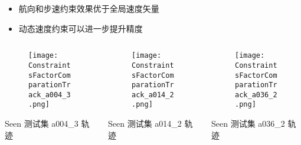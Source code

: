 \begin{frame}
\begin{columns}[t]
		\begin{column}{0.5\textwidth}
		\vspace{-0.5cm}
		{
		   	\small
			\begin{itemize}
					\item 航向和步速约束效果优于全局速度矢量
					\item 动态速度约束可以进一步提升精度
			\end{itemize}
		 }
		\end{column}    
	\end{columns}
	\begin{columns}[t]
		\begin{column}{0.3\textwidth}
		   	\begin{figure}
    			\texttt{[image: ConstraintsFactorComparationTrack\_a004\_3.png]}
		   	\end{figure}
		   	\vspace{-0.5cm}
		   	\hspace{1.2cm} {\tiny Seen 测试集 a004\_3 轨迹}
		\end{column}   
		\begin{column}{0.3\textwidth}
		   	\begin{figure}
    			\texttt{[image: ConstraintsFactorComparationTrack\_a014\_2.png]}
		   	\end{figure}
		   	\vspace{-0.5cm}
		   	\hspace{1.2cm} {\tiny Seen 测试集 a014\_2 轨迹}
		\end{column}  
		\begin{column}{0.3\textwidth}
		   	\begin{figure}
    			\texttt{[image: ConstraintsFactorComparationTrack\_a036\_2.png]}
		   	\end{figure}
		   	\vspace{-0.5cm}
		   	\hspace{1.2cm} {\tiny Seen 测试集 a036\_2 轨迹}
		\end{column}
	\end{columns} 		
\end{frame}


